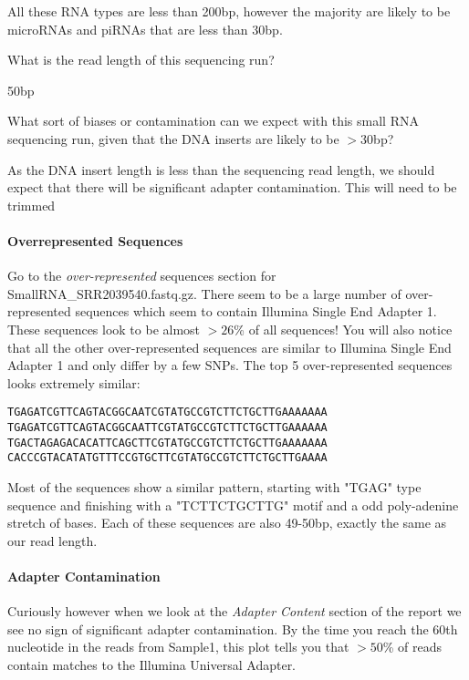 All these RNA types are less than 200bp, however the majority are likely to be microRNAs and piRNAs that are less than 30bp.

\begin{questions}
What is the read length of this sequencing run? \\
\begin{answer}
50bp \\
\end{answer}
What sort of biases or contamination can we expect with this small RNA sequencing run, given that the DNA inserts are likely to be $>30$bp? \\
\begin{answer}
As the DNA insert length is less than the sequencing read length, we should expect that there will be significant adapter contamination. This will need to be trimmed
\end{answer}
\end{questions}

\paragraph{Overrepresented Sequences}
Go to the \textit{over-represented} sequences section for SmallRNA\_SRR2039540.fastq.gz.
There seem to be a large number of over-represented sequences which seem to contain Illumina Single End Adapter 1. These sequences look to be almost $>26$\% of all sequences! You will also notice that all the other over-represented sequences are similar to Illumina Single End Adapter 1 and only differ by a few SNPs. The top 5 over-represented sequences looks extremely similar: \\

\begin{lstlisting}
TGAGATCGTTCAGTACGGCAATCGTATGCCGTCTTCTGCTTGAAAAAAA
TGAGATCGTTCAGTACGGCAATTCGTATGCCGTCTTCTGCTTGAAAAAA
TGACTAGAGACACATTCAGCTTCGTATGCCGTCTTCTGCTTGAAAAAAA
CACCCGTACATATGTTTCCGTGCTTCGTATGCCGTCTTCTGCTTGAAAA
\end{lstlisting}

Most of the sequences show a similar pattern, starting with "TGAG" type sequence and finishing with a "TCTTCTGCTTG" motif and a odd poly-adenine stretch of bases. Each of these sequences are also 49-50bp, exactly the same as our read length.

\paragraph{Adapter Contamination}
Curiously however when we look at the \textit{Adapter Content} section of the report we see no sign of significant adapter contamination.
By the time you reach the 60th nucleotide in the reads from Sample1, this plot tells you that $>50$\% of reads contain matches to the Illumina Universal Adapter.

